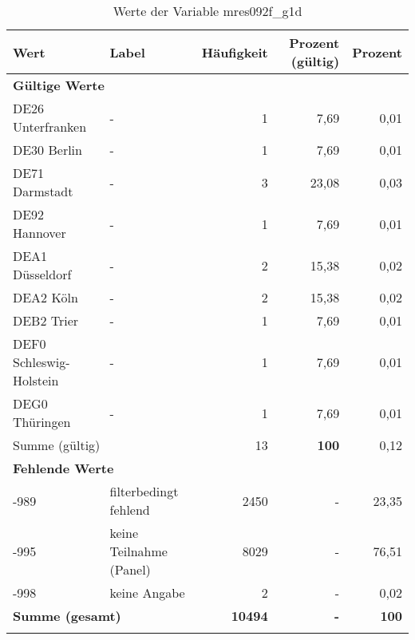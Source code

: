      \begin{longtable}{Xlrrr}
     \toprule
     \textbf{Wert} & \textbf{Label} & \textbf{Häufigkeit} & \textbf{Prozent (gültig)} & \textbf{Prozent} \\
     \endhead
     \midrule
     \multicolumn{5}{l}{\textbf{Gültige Werte}}\\

     \multicolumn{1}{X}{DE26 Unterfranken} &
     - &
     1 &
     7,69 &
     0,01 \\

     \multicolumn{1}{X}{DE30 Berlin} &
     - &
     1 &
     7,69 &
     0,01 \\

     \multicolumn{1}{X}{DE71 Darmstadt} &
     - &
     3 &
     23,08 &
     0,03 \\

     \multicolumn{1}{X}{DE92 Hannover} &
     - &
     1 &
     7,69 &
     0,01 \\

     \multicolumn{1}{X}{DEA1 Düsseldorf} &
     - &
     2 &
     15,38 &
     0,02 \\

     \multicolumn{1}{X}{DEA2 Köln} &
     - &
     2 &
     15,38 &
     0,02 \\

     \multicolumn{1}{X}{DEB2 Trier} &
     - &
     1 &
     7,69 &
     0,01 \\

     \multicolumn{1}{X}{DEF0 Schleswig-Holstein} &
     - &
     1 &
     7,69 &
     0,01 \\

     \multicolumn{1}{X}{DEG0 Thüringen} &
     - &
     1 &
     7,69 &
     0,01 \\
     \midrule
      \multicolumn{2}{l}{Summe (gültig)} & 13 &
      \textbf{100} &
         0,12 \\
     \multicolumn{5}{l}{\textbf{Fehlende Werte}}\\
       -989 & filterbedingt fehlend & 2450 & - & 23,35 \\

       -995 & keine Teilnahme (Panel) & 8029 & - & 76,51 \\

       -998 & keine Angabe & 2 & - & 0,02 \\

     \midrule
     \multicolumn{2}{l}{\textbf{Summe (gesamt)}} & \textbf{10494} & \textbf{-} & \textbf{100} \\
     \bottomrule
     \caption{Werte der Variable mres092f\_g1d}
     \end{longtable}
     
